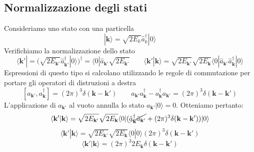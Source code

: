\subsection{Normalizzazione degli stati}
Consideriamo uno stato con una particella
$$
|\mathbf{k}\rangle = \sqrt{2E_k} \hat{a}_k^\dagger |0\rangle
$$
Verifichiamo la normalizzazione dello stato
$$
\langle \mathbf{k}'| = (\sqrt{2E_{\mathbf{k}'}} \hat{a}_{\mathbf{k}'}^\dagger |0\rangle)^\dagger = \langle 0 | \hat{a}_{\mathbf{k}'} \sqrt{2E_{\mathbf{k}'}} \qquad \langle \mathbf{k}' | \mathbf{k} \rangle = \sqrt{2E_{\mathbf{k}'}} \sqrt{2E_\mathbf{k}} \langle 0 | \hat{a}_{\mathbf{k}'} \hat{a}_\mathbf{k}^\dagger | 0 \rangle
$$
Espressioni di questo tipo si calcolano utilizzando le regole di commutazione per portare gli operatori di distruzioni a destra
$$
[a_{\mathbf{k}'}, a_\mathbf{k}^\dagger] = (2\pi)^3 \delta(\mathbf{k} - \mathbf{k}') \qquad a_{\mathbf{k}'} a_\mathbf{k}^\dagger - a_\mathbf{k}^\dagger a_{\mathbf{k}'} = (2\pi)^3 \delta(\mathbf{k} - \mathbf{k}')
$$
L'applicazione di $a_{\mathbf{k}'}$ al vuoto annulla lo stato $a_{\mathbf{k}'}|0\rangle=0$. Otteniamo pertanto:
$$
\langle \mathbf{k}' | \mathbf{k} \rangle = \sqrt{2E_{\mathbf{k}'}} \sqrt{2E_\mathbf{k}} \langle 0 | (\cancel{\hat{a}_\mathbf{k}^\dagger \hat{a}_{\mathbf{k}'}} + (2\pi)^3 \delta(\mathbf{k} - \mathbf{k}')) | 0 \rangle
$$
$$
\langle \mathbf{k}' | \mathbf{k} \rangle = \sqrt{2E_{\mathbf{k}'}} \sqrt{2E_\mathbf{k}} \langle 0 | 0 \rangle (2\pi)^3 \delta(\mathbf{k} - \mathbf{k}')
$$
$$
\langle\mathbf{k}' | \mathbf{k} \rangle = (2\pi)^3 2E_\mathbf{k} \delta(\mathbf{k} - \mathbf{k}')
$$

